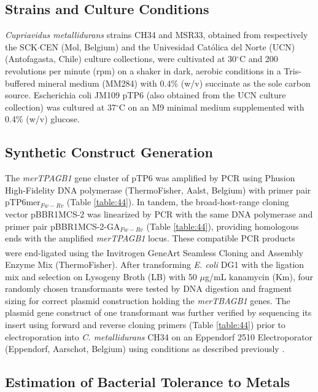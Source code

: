 \subsection{Strains and Culture Conditions}

\textit{Cupriavidus metallidurans} strains CH34 and MSR33, obtained from respectively the SCK$\cdot$CEN (Mol, Belgium) and the Univesidad Católica del Norte (UCN) (Antofagasta, Chile) culture collections, were cultivated at 30$^{\circ}$C and 200 revolutions per minute (rpm) on a shaker in dark, aerobic conditions in a Tris-buffered mineral medium (MM284) \citep{mergeay1985alcaligenes} with 0.4\% (w/v) succinate as the sole carbon source. Escherichia coli JM109 pTP6 (also obtained from the UCN culture collection) was cultured at 37$^{\circ}$C on an M9 minimal medium \citep{sambrook1989molecular} supplemented with 0.4\% (w/v) glucose.

\subsection{Synthetic Construct Generation}

The \textit{merTPAGB1} gene cluster of pTP6 was amplified by PCR using Phusion High-Fidelity DNA polymerase (ThermoFisher, Aalst, Belgium) with primer pair pTP6mer$_{Fw-Rv}$ (Table \ref{table:44}). In tandem, the broad-host-range cloning vector pBBR1MCS-2 \citep{kovach1995four} was linearized by PCR with the same DNA polymerase and primer pair pBBR1MCS-2-GA$_{Fw-Rv}$ (Table \ref{table:44}), providing homologous ends with the amplified \textit{merTPAGB1} locus. These compatible PCR products were end-ligated using the Invitrogen GeneArt \textsuperscript{\tiny\textregistered} Seamless Cloning and Assembly Enzyme Mix (ThermoFisher). After transforming \textit{E. coli} DG1 with the ligation mix and selection on Lysogeny Broth (LB) with 50 $\mu$g/mL kanamycin (Km), four randomly chosen transformants were tested by DNA digestion and fragment sizing for correct plasmid construction holding the \textit{merTBAGB1} genes. The plasmid gene construct of one transformant was further verified by sequencing its insert using forward and reverse cloning primers (Table \ref{table:44}) prior to electroporation into \textit{C. metallidurans} CH34 on an Eppendorf 2510 Electroporator (Eppendorf, Aarschot, Belgium) using conditions as described previously \citep{taghavi1994electroporation}.

\subsection{Estimation of Bacterial Tolerance to Metals}

